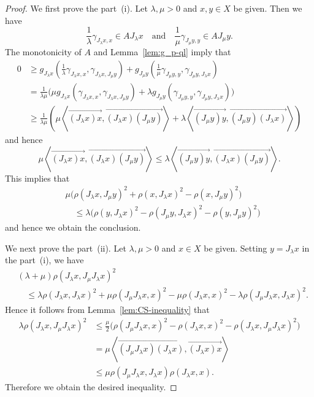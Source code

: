 \documentclass[draft]{amsart}
\numberwithin{equation}{section}
\newcommand{\ip}[2]{\left\langle #1, #2 \right\rangle}
\theoremstyle{plain}
\theoremstyle{definition}
\theoremstyle{remark}
\begin{document}
\begin{proof}
 We first prove the part~(i). Let $\lambda, \mu>0$ and $x,y\in X$ 
 be given. Then we have 
 \[
  \frac{1}{\lambda} \gamma_{J_{\lambda}x, x} \in AJ_{\lambda}x 
  \quad \textrm{and} \quad 
  \frac{1}{\mu} \gamma_{J_{\mu}y, y} \in AJ_{\mu}y.   
 \]
 The monotonicity of $A$ and Lemma~\ref{lem:g_p-ql} imply that 
 \begin{align*}
  0
 &\geq g_{J_{\lambda}x}\left(
  \frac{1}{\lambda}\gamma_{J_{\lambda}x, x}, \gamma_{J_{\lambda}x, J_{\mu}y}
 \right)
  + g_{J_{\mu}y}\left(
  \frac{1}{\mu}\gamma_{J_{\mu}y, y}, \gamma_{J_{\mu}y, J_{\lambda}x}
 \right) \\
 &= \frac{1}{\lambda \mu} \bigl(\mu g_{J_{\lambda}x}\left(
  \gamma_{J_{\lambda}x, x}, \gamma_{J_{\lambda}x, J_{\mu}y}
 \right)
  + \lambda g_{J_{\mu}y}\left(
  \gamma_{J_{\mu}y, y}, \gamma_{J_{\mu}y, J_{\lambda}x}
 \right)
  \bigr) \\
 &\geq \frac{1}{\lambda \mu} \left(
   \mu \ip{\overrightarrow{(J_{\lambda}x)x}}{\overrightarrow{(J_{\lambda}x)(J_{\mu}y)}}
 + \lambda \ip{\overrightarrow{(J_{\mu}y)y}}{\overrightarrow{(J_{\mu}y)(J_{\lambda}x)}} 
  \right) 
 \end{align*}
 and hence 
 \[
  \mu \ip{\overrightarrow{(J_{\lambda}x)x}}{\overrightarrow{(J_{\lambda}x)(J_{\mu}y)}}
  \leq 
  \lambda \ip{\overrightarrow{(J_{\mu}y)y}}{\overrightarrow{(J_{\lambda}x)(J_{\mu}y)}}. 
 \]
 This implies that 
 \begin{align*}
 & \mu \bigl(
 \rho(J_{\lambda}x, J_{\mu}y)^2 + \rho(x, J_{\lambda}x)^2 - \rho(x, J_{\mu}y)^2 
 \bigr) \\
 &\quad \leq 
 \lambda \bigl(
 \rho(y, J_{\lambda}x)^2 - \rho(J_{\mu}y, J_{\lambda}x)^2 - \rho(y, J_{\mu}y)^2\bigr)
 \end{align*}
 and hence we obtain the conclusion. 

 We next prove the part~(ii). Let $\lambda, \mu>0$ and $x\in X$ be given. 
 Setting $y=J_{\lambda}x$ in the part~(i), we have 
 \begin{align*}
 &(\lambda + \mu) \rho(J_{\lambda}x, J_{\mu}J_{\lambda} x)^2 \\
 &\quad \leq \lambda \rho(J_{\lambda}x, J_{\lambda}x)^2 
 + \mu \rho(J_{\mu}J_{\lambda}x,x)^2
 -\mu \rho(J_{\lambda}x, x)^2
 -\lambda \rho(J_{\mu}J_{\lambda}x, J_{\lambda}x)^2. 
 \end{align*}
Hence it follows from Lemma~\ref{lem:CS-inequality} that 
 \begin{align*}
 \lambda \rho(J_{\lambda}x, J_{\mu}J_{\lambda} x)^2 
 &\leq 
 \frac{\mu}{2}\bigl(
 \rho(J_{\mu}J_{\lambda}x,x)^2
 -\rho(J_{\lambda}x, x)^2
 -\rho(J_{\lambda}x, J_{\mu}J_{\lambda} x)^2
 \bigr) \\
 &=
 \mu \ip{\overrightarrow{(J_{\mu}J_{\lambda}x)(J_{\lambda}x)}}
 {\overrightarrow{(J_{\lambda}x)x}} \\
 &\leq \mu
 \rho(J_{\mu}J_{\lambda}x, J_{\lambda}x)
 \rho(J_{\lambda}x, x). 
 \end{align*}
 Therefore we obtain the desired inequality. 
\end{proof}
\end{document}
